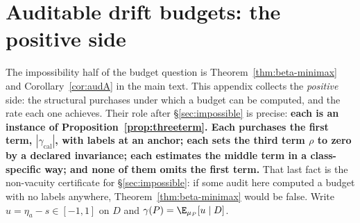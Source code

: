 
\section{Auditable drift budgets: the positive side}\label{app:audit-short}\label{app:auditable}
The impossibility half of the budget question is Theorem~\ref{thm:beta-minimax} and
Corollary~\ref{cor:audA} in the main text. This appendix collects the \emph{positive} side: the
structural purchases under which a budget can be computed, and the rate each one achieves. Their
role after \S\ref{sec:impossible} is precise: \textbf{each is an instance of
Proposition~\ref{prop:threeterm}. Each purchases the first term, $|\gamma_{\mathrm{cal}}|$, with
labels at an anchor; each sets the third term $\rho$ to zero by a declared invariance; each
estimates the middle term in a class-specific way; and none of them omits the first term.} That last
fact is the non-vacuity certificate for \S\ref{sec:impossible}: if some audit here computed a budget
with no labels anywhere, Theorem~\ref{thm:beta-minimax} would be false. Write $u=\eta_a-s\in[-1,1]$ on $D$ and $\gamma(P)=\E_{\mu_P}[u\mid D]$.

